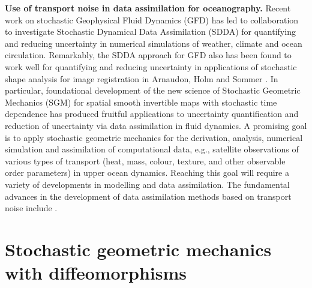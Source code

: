 \documentclass[11pt, oneside]{article}   	%
\numberwithin{equation}{section}
\theoremstyle{plain}
\theoremstyle{definition}
\theoremstyle{remark}
\newcommand{\<}{\langle}
\renewcommand{\>}{\rangle}
\begin{document}
{\bf  Use of transport noise in data assimilation for oceanography.}
Recent work on stochastic Geophysical Fluid Dynamics (GFD) has led to collaboration to investigate  Stochastic Dynamical Data Assimilation (SDDA) for quantifying and reducing uncertainty in numerical simulations of weather, climate and ocean circulation. Remarkably, the SDDA approach for GFD also has been found to work well for quantifying and reducing uncertainty in applications of stochastic shape analysis for image registration in Arnaudon, Holm and Sommer \cite{arnaudon2021stochastic}. 
In particular, foundational development of the new science of Stochastic Geometric Mechanics (SGM) for spatial smooth invertible maps with stochastic time dependence has produced fruitful applications to uncertainty quantification and reduction of uncertainty via data assimilation in fluid dynamics. A promising goal is to apply stochastic geometric mechanics for the derivation, analysis, numerical simulation and assimilation of computational data, e.g., satellite observations of various types of transport (heat, mass, colour, texture, and other observable order parameters) in upper ocean dynamics. Reaching this goal will require a variety of developments in modelling and data assimilation. The fundamental advances in the development of data assimilation methods based on transport noise include \cite{alonso2020modelling,de2020implications,cotter2019numerically,GH19,holm2020stochastic,holm2021astochastic}. 
  

\section{Stochastic geometric mechanics with diffeomorphisms}
\end{document}
